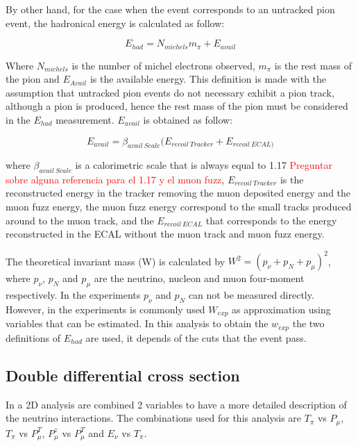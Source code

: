 By other hand, for the case when the event corresponds to an untracked pion event, the hadronical energy is calculated as follow: 

\begin{equation}
    E_{had} = N_{michels}m_\pi + E_{avail}
    \label{eq:EhadUntracked}
\end{equation}

Where $N_{michels}$ is the number of michel electrons observed, $m_\pi$ is the rest mass of the pion and $E_{Avail}$ is the available energy. This definition is made with the assumption that untracked pion events do not necessary exhibit a pion track, although a pion is produced, hence the rest mass of the pion must be considered in the $E_{had}$ measurement. $E_{avail}$ is obtained as follow: 

\begin{equation}
    E_{avail} = \beta_{avail\ Scale}(E_{recoil\ Tracker} + E_{recoil\ ECAL)}
\end{equation}

where $\beta_{avail\ Scale}$ is a calorimetric scale that is always equal to 1.17 \textcolor{red}{Preguntar sobre alguna referencia para el 1.17 y el muon fuzz}, $E_{recoil\ Tracker}$ is the reconstructed energy in the tracker removing the muon deposited energy and the muon fuzz energy, the muon fuzz energy correspond to the small tracks produced around to the muon track, and the $E_{recoil\ ECAL}$ that corresponds to the energy reconstructed in the ECAL without the muon track and muon fuzz energy.

The theoretical invariant mass (W) is calculated by $W^2=(p_\nu+p_N+p_\mu)^2$, where $p_\nu$, $p_N$ and $p_\mu$ are the neutrino, nucleon and muon four-moment respectively. In the experiments $p_\nu$ and $p_N$ can not be measured directly. However, in the experiments is commonly used $W_{exp}$ as approximation using variables that can be estimated. In this analysis to obtain the $w_{exp}$ the two definitions of $E_{had}$ are used, it depends of the cuts that the event pass.  

\subsection{Double differential cross section}
\label{Cap:Analysis:Variables:2DAnalysis}

In a 2D analysis are combined 2 variables to have a more detailed description of the neutrino interactions. The combinations used for this analysis are $T_\pi$ vs $P_\mu$, $T_\pi$ vs $P^T_\mu$, $P^z_\mu$ vs $P^T_\mu$ and $E_\nu$ vs $T_\pi$.


